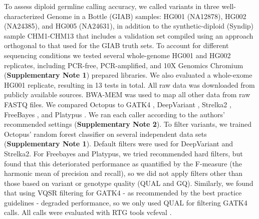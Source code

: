 \documentclass[notitlepage, twocolumn, 10pt]{article}
\begin{document}
To assess diploid germline calling accuracy, we called variants in three well-characterized Genome in a Bottle (GIAB) \cite{RN153} samples: HG001 (NA12878), HG002 (NA24385), and HG005 (NA24631), in addition to the synthetic-diploid (Syndip) sample CHM1-CHM13 \cite{RN605} that includes a validation set compiled using an approach orthogonal to that used for the GIAB truth sets. To account for different sequencing conditions we tested several whole-genome HG001 and HG002 replicates, including PCR-free, PCR-amplified, and 10X Genomics Chromium (\textbf{Supplementary Note 1}) prepared libraries. We also evaluated a whole-exome HG001 replicate, resulting in 13 tests in total. All raw data was downloaded from publicly available sources. BWA-MEM \cite{RN539} was used to map all other data from raw FASTQ files. We compared Octopus to GATK4 \cite{RN598}, DeepVariant \cite{RN619}, Strelka2 \cite{RN604}, FreeBayes \cite{RN538}, and Platypus \cite{RN5}. We ran each caller according to the authors' recommended settings (\textbf{Supplementary Note 2}). To filter variants, we trained Octopus' random forest classifier on several independent data sets (\textbf{Supplementary Note 1}). Default filters were used for DeepVariant and Strelka2. For Freebayes and Platypus, we tried recommended hard filters, but found that this deteriorated performance as quantified by the F-measure (the harmonic mean of precision and recall), so we did not apply filters other than those based on variant or genotype quality (QUAL and GQ). Similarly, we found that using VQSR filtering for GATK4 - as recommended by the best practice guidelines - degraded performance, so we only used QUAL for filtering GATK4 calls. All calls were evaluated with RTG tools vcfeval \cite{RN169}.
\end{document}
